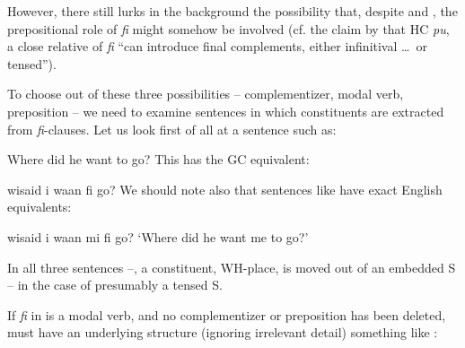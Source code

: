 \z

However, there still lurks in the background the possibility that, despite  and , the prepositional role of \textit{fi} might somehow be involved (cf. the claim by \citet{KoopmanEtAl1981} that HC \textit{pu}, a close relative of \textit{fi} ``can introduce final complements, either infinitival \ldots~or tensed'').

To choose out of these three possibilities -- complementizer, modal verb, preposition -- we need to examine sentences in which
constituents are extracted from \textit{fi}-clauses. Let us look first of all at a sentence such as:

\ea\label{ex:2:196}
Where did he want to go? 
\z
This has the GC equivalent:

\ea\label{ex:2:197}
wisaid i waan fi go?
\z
We should note also that sentences like  have exact English equivalents:

\ea\label{ex:2:198}
wisaid i waan mi fi go?
\glt `Where did he want me to go?'
\z

In all three sentences --, a constituent, WH-place, is moved out of an embedded S -- in the case of  presumably a tensed S.

If \textit{fi} in  is a modal verb, and no complementizer or preposition has been deleted,  must have an underlying structure (ignoring irrelevant detail) something like :

